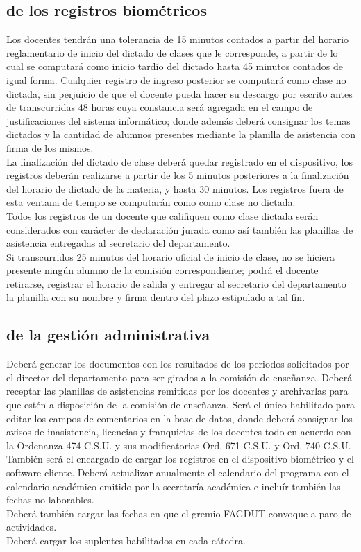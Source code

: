 \subsection{de los registros biométricos}
Los docentes tendrán una tolerancia de 15 minutos contados a partir del horario reglamentario de inicio del dictado de clases que le corresponde, a partir de lo cual se computará como inicio tardío del dictado hasta 45 minutos contados de igual forma. Cualquier registro de ingreso posterior se computará como clase no dictada, sin perjuicio de que el docente pueda hacer su descargo por escrito antes de transcurridas 48 horas cuya constancia será agregada en el campo de justificaciones del sistema informático; donde además deberá consignar los temas dictados y la cantidad de alumnos presentes mediante la planilla de asistencia con firma de los mismos.\\
La finalización del dictado de clase deberá quedar registrado en el dispositivo, los registros deberán realizarse a partir de los 5 minutos posteriores a la finalización del horario de dictado de la materia, y hasta 30 minutos. Los registros fuera de esta ventana de tiempo se computarán como como clase no dictada.\\
Todos los registros de un docente que califiquen como clase dictada serán considerados con carácter de declaración jurada como así también las planillas de asistencia entregadas al secretario del departamento.\\
Si transcurridos 25 minutos del horario oficial de inicio de clase, no se hiciera presente ningún alumno de la comisión correspondiente; podrá el docente retirarse, registrar el horario de salida y entregar al secretario del departamento la planilla con su nombre y firma dentro del plazo estipulado a tal fin.\\
\subsection{de la gestión administrativa}
 Deberá generar los documentos con los resultados de los periodos solicitados por el director del departamento para ser girados a la comisión de enseñanza. Deberá receptar las planillas de asistencias remitidas por los docentes y archivarlas para que estén a disposición de la comisión de enseñanza. Será el único habilitado para editar los campos de comentarios en la base de datos, donde deberá consignar los avisos de inasistencia, licencias y franquicias de los docentes todo en acuerdo con la Ordenanza 474 C.S.U. y sus modificatorias Ord. 671 C.S.U. y Ord. 740 C.S.U.\\
También será el encargado de cargar los registros en el dispositivo biométrico y el software cliente. Deberá actualizar anualmente el calendario del programa con el calendario académico emitido por la secretaría académica e incluír también las fechas no laborables.\\
Deberá también cargar las fechas en que el gremio FAGDUT convoque a paro de actividades.\\
Deberá cargar los suplentes habilitados en cada cátedra.
